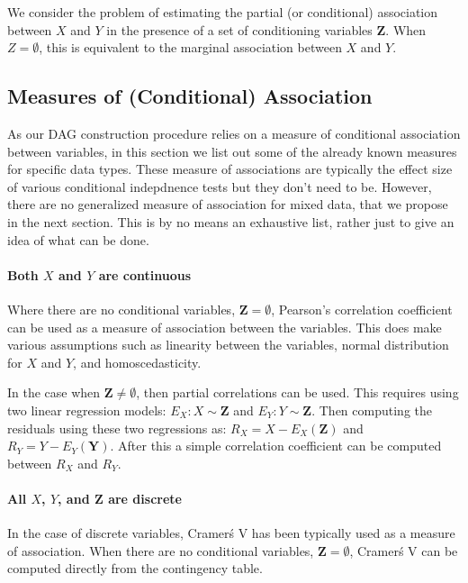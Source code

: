 \documentclass[letterpaper]{article} %
\begin{document}
We consider the problem of estimating the partial (or conditional) association
between $ X $ and $ Y $ in the presence of a set of conditioning variables $
\bm{Z} $. When $ Z = \emptyset $, this is equivalent to the marginal
association between $ X $ and $ Y $.

\subsection{Measures of (Conditional) Association}
As our DAG construction procedure relies on a measure of conditional
association between variables, in this section we list out some of the already
known measures for specific data types. These measure of associations are
typically the effect size of various conditional indepdnence tests but they
don't need to be. However, there are no generalized measure of association for
mixed data, that we propose in the next section. This is by no means an
exhaustive list, rather just to give an idea of what can be done.

\paragraph{Both $ X $ and $ Y $ are continuous}
Where there are no conditional variables, $ \bm{Z} = \emptyset $, Pearson's
correlation coefficient can be used as a measure of association between the
variables. This does make various assumptions such as linearity between the
variables, normal distribution for $ X $ and $ Y $, and homoscedasticity.

In the case when $ \bm{Z} \neq \emptyset $, then partial correlations can be
used. This requires using two linear regression models: $ E_X: X \sim \bm{Z} $
and $ E_Y: Y \sim \bm{Z} $. Then computing the residuals using these two
regressions as: $ R_X = X - E_X(\bm{Z}) $ and $ R_Y = Y - E_Y(\bm{Y}) $. After
this a simple correlation coefficient can be computed between $ R_X $ and $ R_Y $.

\paragraph{All $ X $, $ Y $, and $ \bm{Z} $ are discrete}

In the case of discrete variables, Cramer\'s V has been typically used as a
measure of association. When there are no conditional variables, $ \bm{Z} = \emptyset $,
Cramer\'s V can be computed directly from the contingency table.
\end{document}

